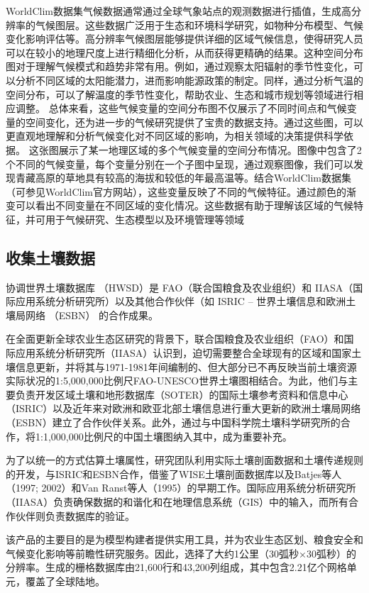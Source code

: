 \documentclass{article}
\begin{document}
	WorldClim数据集气候数据通常通过全球气象站点的观测数据进行插值，生成高分辨率的气候图层。这些数据广泛用于生态和环境科学研究，如物种分布模型、气候变化影响评估等。高分辨率气候图层能够提供详细的区域气候信息，使得研究人员可以在较小的地理尺度上进行精细化分析，从而获得更精确的结果。这种空间分布图对于理解气候模式和趋势非常有用。例如，通过观察太阳辐射的季节性变化，可以分析不同区域的太阳能潜力，进而影响能源政策的制定。同样，通过分析气温的空间分布，可以了解温度的季节性变化，帮助农业、生态和城市规划等领域进行相应调整。
	总体来看，这些气候变量的空间分布图不仅展示了不同时间点和气候变量的空间变化，还为进一步的气候研究提供了宝贵的数据支持。通过这些图，可以更直观地理解和分析气候变化对不同区域的影响，为相关领域的决策提供科学依据。 这张图展示了某一地理区域的多个气候变量的空间分布情况。图像中包含了2个不同的气候变量，每个变量分别在一个子图中呈现，通过观察图像，我们可以发现青藏高原的草地具有较高的海拔和较低的年最高温等。结合WorldClim数据集（可参见WorldClim官方网站），这些变量反映了不同的气候特征。通过颜色的渐变可以看出不同变量在不同区域的变化情况。这些数据有助于理解该区域的气候特征，并可用于气候研究、生态模型以及环境管理等领域
	
	\subsection{收集土壤数据}
	协调世界土壤数据库 （HWSD）是 FAO（联合国粮食及农业组织）和 IIASA（国际应用系统分析研究所）以及其他合作伙伴（如 ISRIC – 世界土壤信息和欧洲土壤局网络 （ESBN） 的合作成果。
	
	在全面更新全球农业生态区研究的背景下，联合国粮食及农业组织（FAO）和国际应用系统分析研究所（IIASA）认识到，迫切需要整合全球现有的区域和国家土壤信息更新，并将其与1971-1981年间编制的、但大部分已不再反映当前土壤资源实际状况的1:5,000,000比例尺FAO-UNESCO世界土壤图相结合。为此，他们与主要负责开发区域土壤和地形数据库（SOTER）的国际土壤参考资料和信息中心（ISRIC）以及近年来对欧洲和欧亚北部土壤信息进行重大更新的欧洲土壤局网络（ESBN）建立了合作伙伴关系。此外，通过与中国科学院土壤科学研究所的合作，将1:1,000,000比例尺的中国土壤图纳入其中，成为重要补充。
	
	为了以统一的方式估算土壤属性，研究团队利用实际土壤剖面数据和土壤传递规则的开发，与ISRIC和ESBN合作，借鉴了WISE土壤剖面数据库以及Batjes等人（1997; 2002）和Van Ranst等人（1995）的早期工作。国际应用系统分析研究所（IIASA）负责确保数据的和谐化和在地理信息系统（GIS）中的输入，而所有合作伙伴则负责数据库的验证。
	
	该产品的主要目的是为模型构建者提供实用工具，并为农业生态区划、粮食安全和气候变化影响等前瞻性研究服务。因此，选择了大约1公里（30弧秒×30弧秒）的分辨率。生成的栅格数据库由21,600行和43,200列组成，其中包含2.21亿个网格单元，覆盖了全球陆地。
	
\end{document}
